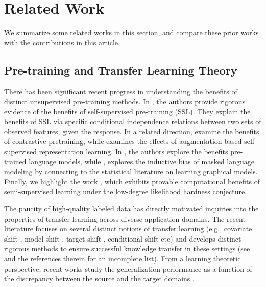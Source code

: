 \section{Related Work}
We summarize some related works in this section, and compare these prior works with the contributions in this article.


\subsection{Pre-training and Transfer Learning Theory}
There has been significant recent progress in understanding the benefits of distinct unsupervised pre-training methods. In \citet{lee2021predicting}, the authors provide rigorous evidence of the benefits of self-supervised pre-training (SSL). They explain the benefits of SSL via specific conditional independence relations between two sets of observed features, given the response. In a related direction, \citet{arora2019theoretical,tosh2021contrastive,tosh2021contrastive2} examine the benefits of contrastive pretraining, while \citet{zhai2023understanding} examines the effects of augmentation-based self-supervised representation learning. In \citet{wei2021pretrained}, the authors explore the benefits pre-trained language models, while  \citet{zhang2021inductive}, explores the inductive bias of masked language modeling by connecting to the statistical literature on learning graphical models. Finally, we highlight the work \cite{azar2024semi}, which  exhibits provable computational benefits of semi-supervised learning under the low-degree likelihood hardness conjecture.


The paucity of high-quality labeled data has directly motivated inquiries into the properties of transfer learning across diverse application domains. The recent literature focuses on several distinct notions of transfer learning (e.g., covariate shift \cite{heckman1979sample,huang2006correcting,shimodaira2000improving}, model shift \cite{wang2015generalization,wang2014active}, target shift \cite{maity2022minimax}, conditional shift  \cite{quinonero2022dataset,storkey2008training} etc) and develops distinct rigorous methods to ensure successful knowledge transfer in these settings (see \cite{shimodaira2000improving,wu2019domain,sagawa2019distributionally,ganin2016domain,long2017deep} and the references therein for an incomplete list). From a learning theoretic perspective, recent works study the generalization performance as a function of the discrepancy between the source and the target domains \cite{albuquerque2019generalizing,ben2010theory,david2010impossibility,hanneke2019value,tachet2020domain,zhao2019learning}.


